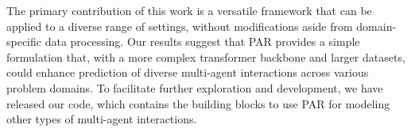 The primary contribution of this work is a versatile framework that can be applied to a diverse range of settings, without modifications aside from domain-specific data processing. Our results suggest that PAR provides a simple formulation that, with a more complex transformer backbone and larger datasets, could enhance prediction of diverse multi-agent interactions across various problem domains. To facilitate further exploration and development, we have released our code, which contains the building blocks to use PAR for modeling other types of multi-agent interactions.
